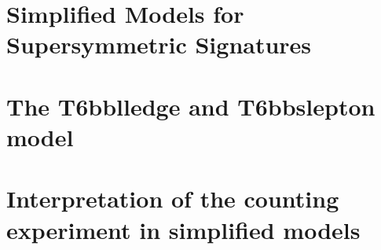\section{Simplified Models for Supersymmetric Signatures}
\section{The T6bblledge and T6bbslepton model}
\section{Interpretation of the counting experiment in simplified models}